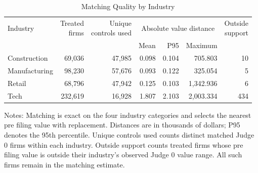 \begin{table}[H]
\centering
\caption{Matching Quality by Industry}
\label{tab:q7_matching_quality_industry}
\small
\renewcommand{\arraystretch}{1.15}
\setlength{\tabcolsep}{4pt}
\begin{tabular*}{\linewidth}{@{\extracolsep{\fill}}lrrrrrr@{}}
\toprule
Industry & \shortstack{Treated\\firms} & \shortstack{Unique\\controls used} & \multicolumn{3}{c}{Absolute value distance} & \shortstack{Outside\\support} \\
\cmidrule(lr){4-6}
 & & & Mean & P95 & Maximum & \\
\midrule
Construction & 69,036 & 47,985 & 0.098 & 0.104 & 705.803 & 10 \\
Manufacturing & 98,230 & 57,676 & 0.093 & 0.122 & 325.054 & 5 \\
Retail & 68,796 & 47,942 & 0.125 & 0.103 & 1,342.936 & 6 \\
Tech & 232,619 & 16,928 & 1.807 & 2.103 & 2,003.334 & 434 \\
\bottomrule
\end{tabular*}
\par\vspace{4pt}
\begin{minipage}{\linewidth}
\footnotesize Notes: Matching is exact on the four industry categories and selects the nearest pre filing value with replacement. Distances are in thousands of dollars; P95 denotes the 95th percentile. Unique controls used counts distinct matched Judge 0 firms within each industry. Outside support counts treated firms whose pre filing value is outside their industry's observed Judge 0 value range. All such firms remain in the matching estimate.
\end{minipage}
\end{table}
